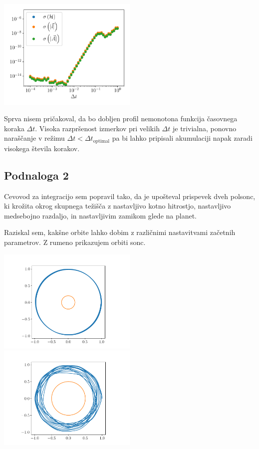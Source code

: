 \begin{center}
    \includegraphics[width=0.5\textwidth]{../images/1-stds.pdf }
\end{center}

Sprva nisem pričakoval, da bo dobljen profil nemonotona funkcija časovnega
koraka $\Delta t$. Visoka razpršenost izmerkov pri velikih $\Delta t$ je trivialna,
ponovno naraščanje v režimu $\Delta t < \Delta t_{\text{optimal}}$ pa bi lahko
pripisali akumulaciji napak zaradi visokega števila korakov.
\clearpage

\subsection{Podnaloga 2}

Cevovod za integracijo sem popravil tako, da je upošteval prispevek dveh
polsonc, ki krožita okrog skupnega težišča z nastavljivo kotno hitrostjo,
nastavljivo medsebojno razdaljo, in nastavljivim zamikom glede na planet.

Raziskal sem, kakšne orbite lahko dobim z različnimi nastavitvami začetnih
parametrov. Z rumeno prikazujem orbiti sonc.
\begin{center}
    \includegraphics[width=0.5\textwidth]{../images/2-1-orbite_1.pdf}\hfill
    \includegraphics[width=0.5\textwidth]{../images/2-1-orbite_2.pdf}

\end{center}

